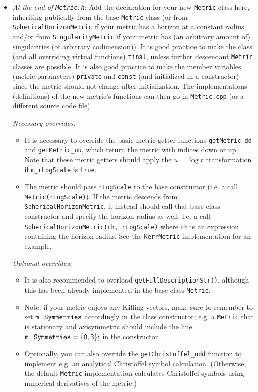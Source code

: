 \documentclass[11pt,a4paper]{article}
\newcommand{\code}[1]{{\tt #1}}
\begin{document}
\begin{itemize}
 \item[A.] \emph{At the end of \code{Metric.h}}: Add the declaration for your new \code{Metric} class here, inheriting publically from the base \code{Metric} class (or from \code{SphericalHorizonMetric} if your metric has a horizon at a constant radius, and/or from \code{SingularityMetric} if your metric has (an arbitrary amount of) singularities (of arbitrary codimension)). It is good practice to make the class (and all overriding virtual functions) \code{final}, unless further descendant \code{Metric} classes are possible. It is also good practice to make the member variables (metric parameters) \code{private} and \code{const} (and initialized in a constructor) since the metric should not change after initialization.  The implementations (definitions) of the new metric's functions can then go in \code{Metric.cpp} (or a different source code file).

 \emph{Necessary overrides:}
 \begin{itemize}
     \item It is necessary to override the basic metric getter functions \code{getMetric\_dd} and \code{getMetric\_uu}, which return the metric with indices down or up. Note that these metric getters should apply the $u=\log r$ transformation if \code{m\_rLogScale} is \code{true}.
     \item The metric should pass \code{rLogScale} to the base constructor (i.e. a call \code{Metric(rLogScale)}). If the metric descends from \code{SphericalHorizonMetric}, it instead should call that base class constructor and specify the horizon radius as well, i.e. a call\\ \code{SphericalHorizonMetric(rh, rLogScale)} where \code{rh} is an expression containing the horizon radius. See the \code{KerrMetric} implementation for an example.
 \end{itemize}
 
 \emph{Optional overrides:}
 \begin{itemize}
     \item It is also recommended to overload \code{getFullDescriptionStr()}, although this has been already implemented in the base class \code{Metric}.
     \item  Note: if your metric enjoys any Killing vectors, make sure to remember to set $\code{m\_Symmetries}$ accordingly in the class constructor; e.g. a \code{Metric} that is stationary and axisymmetric should include the line $\code{m\_Symmetries = \{ 0,3 \};}$ in the constructor.
 \item  Optionally, you can also override the \code{getChristoffel\_udd} function to implement e.g. an analytical Christoffel symbol calculation. (Otherwise, the default \code{Metric} implementation calculates Christoffel symbols using numerical derivatives of the metric.) 
 \end{itemize}


\end{itemize}
\end{document}
